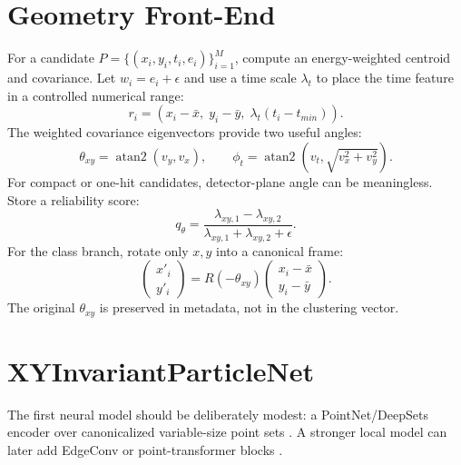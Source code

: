 \documentclass[11pt,a4paper]{article}
\newcommand{\thetaxy}{\theta_{xy}}
\newcommand{\phit}{\phi_t}
\begin{document}
\section{Geometry Front-End}

For a candidate $P=\{(x_i,y_i,t_i,e_i)\}_{i=1}^{M}$, compute an energy-weighted centroid and covariance. Let $w_i=e_i+\epsilon$ and use a time scale $\lambda_t$ to place the time feature in a controlled numerical range:
\[
r_i=(x_i-\bar{x},\; y_i-\bar{y},\; \lambda_t(t_i-t_{min})).
\]
The weighted covariance eigenvectors provide two useful angles:
\[
\thetaxy=\operatorname{atan2}(v_y,v_x),\qquad
\phit=\operatorname{atan2}\left(v_t,\sqrt{v_x^2+v_y^2}\right).
\]
For compact or one-hit candidates, detector-plane angle can be meaningless. Store a reliability score:
\[
q_\theta=\frac{\lambda_{xy,1}-\lambda_{xy,2}}{\lambda_{xy,1}+\lambda_{xy,2}+\epsilon}.
\]
For the class branch, rotate only $x,y$ into a canonical frame:
\[
\begin{pmatrix}x'_i\\y'_i\end{pmatrix}
=R(-\thetaxy)
\begin{pmatrix}x_i-\bar{x}\\y_i-\bar{y}\end{pmatrix}.
\]
The original $\thetaxy$ is preserved in metadata, not in the clustering vector.

\section{XYInvariantParticleNet}

The first neural model should be deliberately modest: a PointNet/DeepSets encoder over canonicalized variable-size point sets \citep{qi2017pointnet,zaheer2017deepsets}. A stronger local model can later add EdgeConv or point-transformer blocks \citep{wang2019dgcnn,zhao2021pointtransformer,robles2025pointset}.
\end{document}
